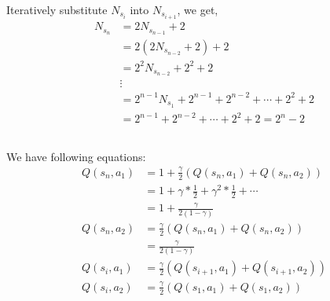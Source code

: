 \documentclass[12pt]{article}
\begin{document}
Iteratively substitute $N_{s_{i}}$ into $N_{s_{i+1}}$, we get,
\begin{align*}
    N_{s_n} &= 2N_{s_{n-1}} + 2\\
    &= 2(2N_{s_{n-2}} + 2) + 2 \\
    &= 2^2N_{s_{n-2}} + 2^2 + 2 \\
    &\vdots \\
    &= 2^{n-1}N_{s_1} + 2^{n-1} + 2^{n-2} + \cdots + 2^2 + 2 \\
    &= 2^{n-1} + 2^{n-2} + \cdots + 2^2 + 2 = 2^n - 2
\end{align*}

\subsection{}
We have following equations:
    \begin{align*}
        Q(s_n,a_1) &= 1 + \frac{\gamma}{2}(Q(s_n,a_1)+Q(s_n,a_2)) \\
                & = 1 + \gamma * \frac{1}{2} +\gamma^2 * \frac{1}{2} + \cdots \\
                & = 1 + \frac{\gamma}{2(1-\gamma)}\\
        Q(s_n,a_2) &= \frac{\gamma}{2}(Q(s_n,a_1)+Q(s_n,a_2))\\
                & = \frac{\gamma}{2(1-\gamma)} \\
        Q(s_{i},a_1) &= \frac{\gamma}{2}(Q(s_{i+1},a_1)+Q(s_{i+1},a_2))\\
        Q(s_{i},a_2) &= \frac{\gamma}{2}(Q(s_1,a_1)+Q(s_1,a_2))
    \end{align*}
\end{document}
